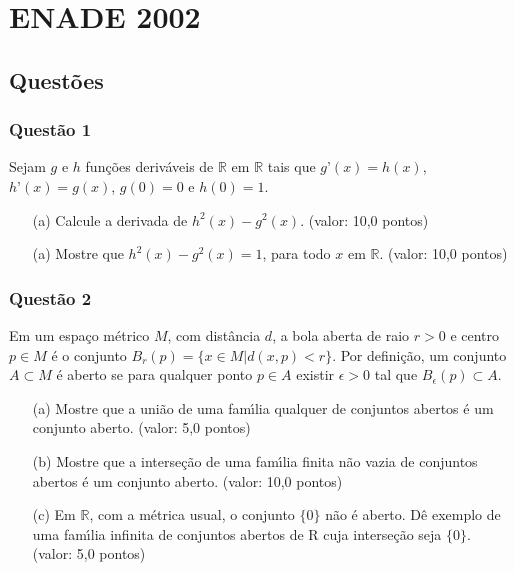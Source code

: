 \chapter{ENADE 2002}

\section{\color{blue} Quest\~oes}

\subsection{\color{blue} Quest\~ao 1}

Sejam $g$ e $h$ fun\c c\~oes deriv\'aveis de $\mathbb R$ em $\mathbb R$ tais que $g’(x)=h(x)$, $h’(x)=g(x)$, $g(0)=0$ e $h(0)=1$.

\begin{enumerate}

\item[(a)] Calcule a derivada de $h^2(x) - g^2(x)$. (valor: 10,0 pontos) 

\item[(a)] Mostre que $h^2(x) - g^2(x) = 1$, para todo $x$ em $\mathbb R$. (valor: 10,0 pontos)

\end{enumerate}

\subsection{\color{blue} Quest\~ao 2}

Em um espa\c co m\'etrico $M$, com dist\^ancia $d$, a bola aberta de raio $r > 0$ e centro $p\in M$ \'e o conjunto $B_r(p) = \{x\in M | d(x,p) < r\}$. Por defini\c c\~ao, um conjunto $A \subset M$ \'e aberto se para qualquer ponto $p \in A$ existir $\epsilon > 0$ tal que $B_\epsilon(p) \subset A$.

\begin{enumerate}

\item[(a)] Mostre que a uni\~ao de uma fam\'\i lia qualquer de conjuntos abertos \'e um conjunto aberto. (valor: 5,0 pontos)

\item[(b)] Mostre que a interse\c c\~ao de uma fam\'\i lia finita n\~ao vazia de conjuntos abertos \'e um conjunto aberto. (valor: 10,0 pontos) 

\item[(c)] Em $\mathbb R$, com a m\'etrica usual, o conjunto $\{0\}$ n\~ao \'e aberto. D\^e exemplo de uma fam\'\i lia infinita de conjuntos abertos de R cuja interse\c c\~ao seja $\{0\}$. (valor: 5,0 pontos)

\end{enumerate}

